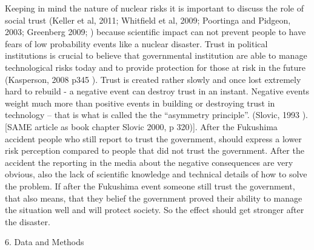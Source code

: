   
Keeping in mind the nature of nuclear risks it is important to discuss the role of social trust (Keller et al, 2011; Whitfield et al, 2009; Poortinga and Pidgeon, 2003; Greenberg 2009; \citep{Whitfield:2009ku,Poortinga:2003cb,Keller:2011gb, Greenberg:2009fx} ) because scientific impact can not prevent people to have fears of low probability events like a nuclear disaster. Trust in political institutions is crucial to believe that governmental institution are able to manage technological risks today and to provide protection for those at risk in the future (Kasperson, 2008 p345 \citep{Kasperson:2008tw}).  
Trust is created rather slowly and once lost extremely hard to rebuild - a negative event can destroy trust in an instant. Negative events weight much more than positive events in building or destroying trust in technology  -- that is what is called the the ``asymmetry principle''. (Slovic, 1993 \citep{Slovic:1993gm}). [SAME article as book chapter Slovic 2000, p 320)].  
After the Fukushima accident people who still report to trust the government, should express a lower risk perception compared to people that did not trust the government. After the accident the reporting in the media about the negative consequences are very obvious, also the lack of scientific knowledge and technical details of how to solve the problem. If after the Fukushima event someone still trust the government, that also means, that they belief the government proved their ability to manage the situation well and will protect society. So the effect should get stronger after the disaster.

    

6. Data and Methods 



